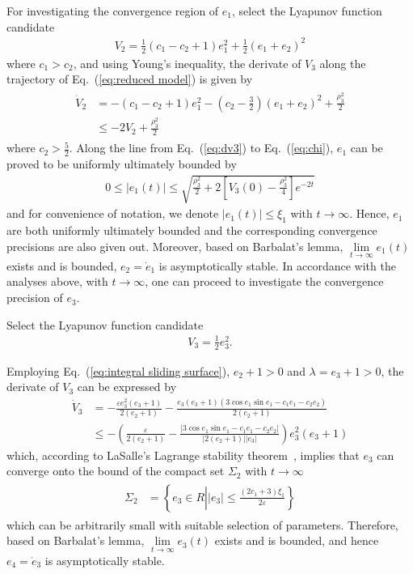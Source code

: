 \documentclass[ShortAfour]{sage}
\theoremstyle{plain}
\theoremstyle{remark}
\begin{document}
For investigating the convergence region of $e_1$, select the Lyapunov function candidate
\begin{align}
  V_2=\frac{1}{2}(c_1-c_2+1)e_1^2+\frac{1}{2}(e_1+e_2)^2
\end{align}
where $c_1>c_2$, and using Young's inequality, the derivate of $V_3$ along the trajectory of Eq.~(\ref{eq:reduced model}) is given by
\begin{align}\begin{split}
  \dot V_2&=-(c_1-c_2+1)e_1^2-\left(c_2-\frac{3}{2}\right)(e_1+e_2)^2+\frac{\rho_3^2}{2}\\
  &\le-2V_2+\frac{\rho_3^2}{2}
\end{split}\end{align}
where $c_2>\frac{5}{2}$. Along the line from Eq.~(\ref{eq:dv3}) to Eq.~(\ref{eq:chi}), $e_1$ can be proved to be uniformly ultimately bounded by
\begin{align}
  0\le\vert e_1(t)\vert\le\sqrt{\frac{\rho_3^2}{2}+2\left[V_3(0)-\frac{\rho_3^2}{4}\right]e^{-2t}}\label{eq:sigma6}
\end{align}
and for convenience of notation, we denote $\vert e_1(t)\vert\le \xi_1$ with $t\to\infty$.
Hence, $e_1$ are both uniformly ultimately bounded and the corresponding convergence precisions are also given out. Moreover, based on Barbalat's lemma, $\lim\limits_{t\to\infty}e_1(t)$ exists and is bounded, $e_2=\dot e_1$ is asymptotically stable. In accordance with the analyses above, with $t\to\infty$, one can proceed to investigate the convergence precision of $e_3$.

Select the Lyapunov function candidate
\begin{align}
  V_3 = \frac{1}{2}e_3^2.
\end{align}

Employing Eq.~(\ref{eq:integral sliding surface}), $e_2+1>0$ and $\lambda = e_3+1>0$, the derivate of $V_3$ can be expressed by
\begin{align}
  \dot V_3 &= -\frac{\varepsilon e_3^2(e_3+1)}{2(e_2+1)}-\frac{e_3(e_3+1)(3\cos e_1\sin e_1-c_1e_1-c_2e_2)}{2(e_2+1)}\\
  &\le -\left(\frac{\varepsilon}{2(e_2+1)}-\frac{\vert 3\cos e_1\sin e_1-c_1e_1-c_2e_2\vert}{\vert2(e_2+1)\vert\vert e_3\vert}\right)e_3^2(e_3+1)
\end{align}
which, according to LaSalle's Lagrange stability theorem~\cite{Lasalle1960}, implies that $e_3$ can converge onto the bound of the compact set $\Sigma_2$ with $t\to\infty$
\begin{align}\begin{split}
  \Sigma_2&=\left\{e_3\in R\left|\vert e_3\vert\le\frac{(2c_1+3)\xi_1}{2\varepsilon}\right.\right\}\label{eq:sigma2}
\end{split}\end{align}
 which can be arbitrarily small with suitable selection of parameters. Therefore, based on Barbalat's lemma, $\lim\limits_{t\to\infty}e_3(t)$ exists and is bounded, and hence $e_4=\dot e_3$ is asymptotically stable.
\end{document}
